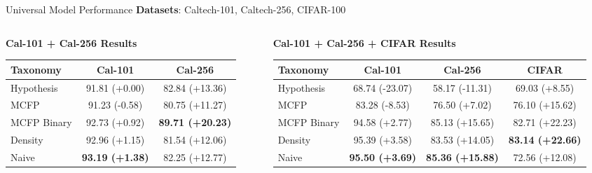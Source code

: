 \documentclass[aspectratio=169]{beamer}
\begin{document}
\begin{frame}{Universal Model Performance}
    \textbf{Datasets}: Caltech-101, Caltech-256, CIFAR-100

    \begin{columns}[T]
        \begin{column}{0.5\textwidth}
            \textbf{Cal-101 + Cal-256 Results}
            \begin{table}[h]
                \centering
                \tiny
                \begin{tabular}{lcc}
                    \toprule
                    \textbf{Taxonomy} & \textbf{Cal-101}       & \textbf{Cal-256}        \\
                    \midrule
                    Hypothesis        & 91.81 (+0.00)          & 82.84 (+13.36)          \\
                    MCFP              & 91.23 (-0.58)          & 80.75 (+11.27)          \\
                    MCFP Binary       & 92.73 (+0.92)          & \textbf{89.71 (+20.23)} \\
                    Density           & 92.96 (+1.15)          & 81.54 (+12.06)          \\
                    Naive             & \textbf{93.19 (+1.38)} & 82.25 (+12.77)          \\
                    \bottomrule
                \end{tabular}
            \end{table}
        \end{column}

        \begin{column}{0.5\textwidth}
            \textbf{Cal-101 + Cal-256 + CIFAR Results}
            \begin{table}[h]
                \centering
                \tiny
                \begin{tabular}{lccc}
                    \toprule
                    \textbf{Taxonomy} & \textbf{Cal-101}       & \textbf{Cal-256}        & \textbf{CIFAR}          \\
                    \midrule
                    Hypothesis        & 68.74 (-23.07)         & 58.17 (-11.31)          & 69.03 (+8.55)           \\
                    MCFP              & 83.28 (-8.53)          & 76.50 (+7.02)           & 76.10 (+15.62)          \\
                    MCFP Binary       & 94.58 (+2.77)          & 85.13 (+15.65)          & 82.71 (+22.23)          \\
                    Density           & 95.39 (+3.58)          & 83.53 (+14.05)          & \textbf{83.14 (+22.66)} \\
                    Naive             & \textbf{95.50 (+3.69)} & \textbf{85.36 (+15.88)} & 72.56 (+12.08)          \\
                    \bottomrule
                \end{tabular}
            \end{table}
        \end{column}
    \end{columns}


\end{frame}
\end{document}
